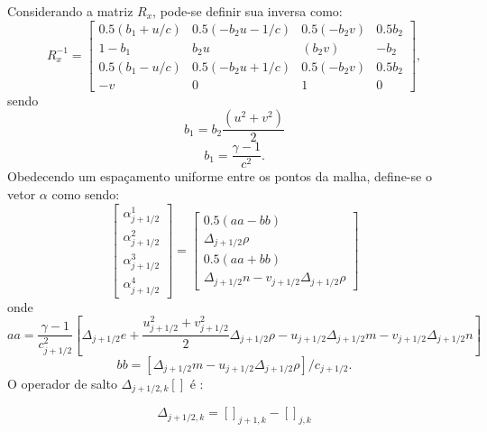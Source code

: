 \documentclass[a4paper, twoside, 12pt]{article}
\numberwithin{equation}{section}
\begin{document}
Considerando a matriz $R_{x}$, pode-se definir sua inversa como:
\begin{equation}
R^{-1}_{x}=\begin{bmatrix}
0.5(b_{1}+u/c) & 0.5(-b_{2}u-1/c) & 0.5(-b_{2}v) & 0.5b_{2} \\ 
1-b_{1}        & b_{2}u           & (b_{2}v)     & -b_{2}\\ 
0.5(b_{1}-u/c) & 0.5(-b_{2}u+1/c) & 0.5(-b_{2}v) & 0.5b_{2}\\ 
-v             & 0                & 1            & 
0\end{bmatrix},
\end{equation}
sendo
\begin{equation}
b_{1}=b_{2}\frac{(u^{2}+v^{2})}{2}
\end{equation}
\begin{equation}
b_{1}=\frac{\gamma-1}{c^{2}}.
\end{equation}
Obedecendo um espaçamento uniforme entre os pontos da malha, define-se o vetor $\alpha$ como sendo:
\begin{equation}
\begin{bmatrix}
\alpha^{1}_{j+1/2}\\ 
\alpha^{2}_{j+1/2}\\ 
\alpha^{3}_{j+1/2}\\ 
\alpha^{4}_{j+1/2}
\end{bmatrix}=
\begin{bmatrix}
0.5(aa-bb)\\ 
\Delta_{j+1/2}\rho\\ 
0.5(aa+bb)\\ 
\Delta_{j+1/2}n-v_{j+1/2}\Delta_{j+1/2}\rho
\end{bmatrix}
\end{equation}
onde
\begin{equation}
aa=\frac{\gamma-1}{c^{2}_{j+1/2}}\left [ \Delta_{j+1/2}e+\frac{u^{2}_{j+1/2}+v^{2}_{j+1/2}}{2}\Delta_{j+1/2}\rho-u_{j+1/2}\Delta_{j+1/2}m-v_{j+1/2}\Delta_{j+1/2}n \right ]
\end{equation}
\begin{equation}
bb=\left [ \Delta_{j+1/2}m-u_{j+1/2}\Delta_{j+1/2}\rho \right ]/c_{j+1/2}.
\end{equation}
O operador de salto $\Delta_{j+1/2,k}[]$ é :

\begin{equation}
    \Delta_{j+1/2,k}=[]_{j+1,k} - []_{j,k}
\end{equation}
\end{document}
